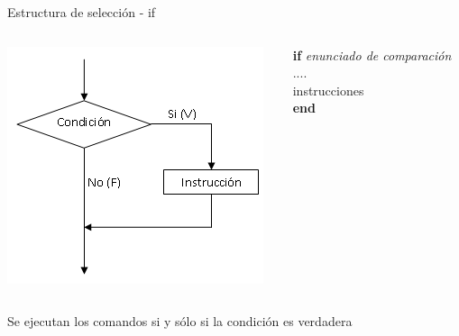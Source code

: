 \documentclass{bredelebeamer}
\begin{document}
\begin{frame}{Estructura de selección - if}
\begin{columns}
\begin{column}{0.5\textwidth}
\begin{center}
\includegraphics[scale=0.5]{images/pantalla5.png}
\end{center}
\end{column}
\begin{column}{0.3\textwidth}
\textbf{if} \textit{enunciado de comparación}\\
	....\\
    instrucciones\\
\textbf{end}
\end{column}
\end{columns}
\begin{center}
Se ejecutan los comandos si y sólo si la condición es verdadera
\end{center}
\end{frame}
\end{document}
